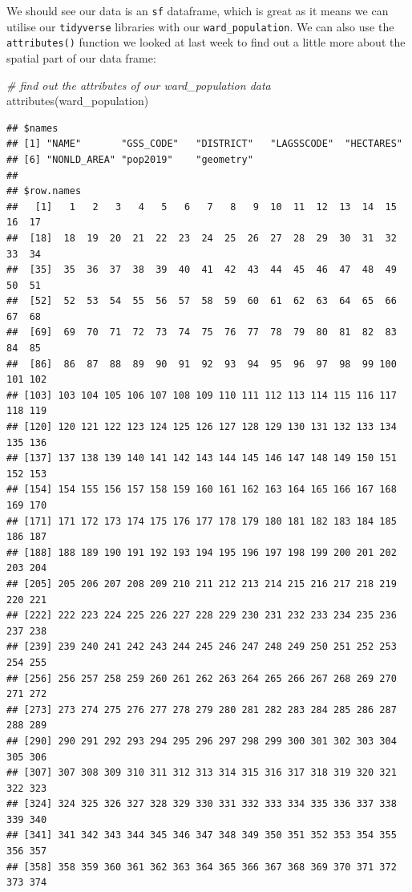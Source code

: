 \documentclass[
]{book}
\newenvironment{Shaded}{\begin{snugshade}}{\end{snugshade}}
\newcommand{\CommentTok}[1]{\textcolor[rgb]{0.56,0.35,0.01}{\textit{#1}}}
\newcommand{\FunctionTok}[1]{\textcolor[rgb]{0.00,0.00,0.00}{#1}}
\newcommand{\NormalTok}[1]{#1}
\begin{document}
We should see our data is an \texttt{sf} dataframe, which is great as it means we can utilise our \texttt{tidyverse} libraries with our \texttt{ward\_population}. We can also use the \texttt{attributes()} function we looked at last week to find out a little more about the spatial part of our data frame:

\begin{Shaded}
\begin{Highlighting}[]
\CommentTok{\# find out the attributes of our ward\_population data}
\FunctionTok{attributes}\NormalTok{(ward\_population)}
\end{Highlighting}
\end{Shaded}

\begin{verbatim}
## $names
## [1] "NAME"       "GSS_CODE"   "DISTRICT"   "LAGSSCODE"  "HECTARES"  
## [6] "NONLD_AREA" "pop2019"    "geometry"  
## 
## $row.names
##   [1]   1   2   3   4   5   6   7   8   9  10  11  12  13  14  15  16  17
##  [18]  18  19  20  21  22  23  24  25  26  27  28  29  30  31  32  33  34
##  [35]  35  36  37  38  39  40  41  42  43  44  45  46  47  48  49  50  51
##  [52]  52  53  54  55  56  57  58  59  60  61  62  63  64  65  66  67  68
##  [69]  69  70  71  72  73  74  75  76  77  78  79  80  81  82  83  84  85
##  [86]  86  87  88  89  90  91  92  93  94  95  96  97  98  99 100 101 102
## [103] 103 104 105 106 107 108 109 110 111 112 113 114 115 116 117 118 119
## [120] 120 121 122 123 124 125 126 127 128 129 130 131 132 133 134 135 136
## [137] 137 138 139 140 141 142 143 144 145 146 147 148 149 150 151 152 153
## [154] 154 155 156 157 158 159 160 161 162 163 164 165 166 167 168 169 170
## [171] 171 172 173 174 175 176 177 178 179 180 181 182 183 184 185 186 187
## [188] 188 189 190 191 192 193 194 195 196 197 198 199 200 201 202 203 204
## [205] 205 206 207 208 209 210 211 212 213 214 215 216 217 218 219 220 221
## [222] 222 223 224 225 226 227 228 229 230 231 232 233 234 235 236 237 238
## [239] 239 240 241 242 243 244 245 246 247 248 249 250 251 252 253 254 255
## [256] 256 257 258 259 260 261 262 263 264 265 266 267 268 269 270 271 272
## [273] 273 274 275 276 277 278 279 280 281 282 283 284 285 286 287 288 289
## [290] 290 291 292 293 294 295 296 297 298 299 300 301 302 303 304 305 306
## [307] 307 308 309 310 311 312 313 314 315 316 317 318 319 320 321 322 323
## [324] 324 325 326 327 328 329 330 331 332 333 334 335 336 337 338 339 340
## [341] 341 342 343 344 345 346 347 348 349 350 351 352 353 354 355 356 357
## [358] 358 359 360 361 362 363 364 365 366 367 368 369 370 371 372 373 374

\end{verbatim}
\end{document}
